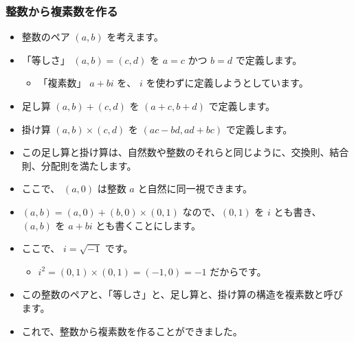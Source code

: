 \documentclass[dvipdfmx]{beamer}
\begin{document}
  \begin{frame}
    \frametitle{整数から複素数を作る}

    \begin{itemize}
      \item 整数のペア $(a,b)$ を考えます。
      \item 「等しさ」 $(a,b) = (c,d)$ を $a=c$ かつ $b=d$ で定義します。
      \begin{itemize}
        \item 「複素数」 $a + bi$ を、 $i$ を使わずに定義しようとしています。
      \end{itemize}

      \pause

      \item 足し算 $(a,b) + (c,d)$ を $(a+c, b+d)$ で定義します。

      \pause

      \item 掛け算 $(a,b) \times (c,d)$ を $(ac-bd, ad+bc)$ で定義します。

      \pause

      \item この足し算と掛け算は、自然数や整数のそれらと同じように、交換則、結合則、分配則を満たします。

      \pause

      \item ここで、 $(a,0)$ は整数 $a$ と自然に同一視できます。
      \item $(a,b) = (a,0) + (b,0) \times (0,1)$ なので、$(0,1)$ を $i$ とも書き、 $(a,b)$ を $a+bi$ とも書くことにします。

      \pause

      \item ここで、 $i = \sqrt{-1}$ です。
      \begin{itemize}
        \item $i^2 = (0,1) \times (0,1) = (-1,0) = -1$ だからです。
      \end{itemize}
      \item この整数のペアと、「等しさ」と、足し算と、掛け算の構造を複素数と呼びます。
      \item これで、整数から複素数を作ることができました。
    \end{itemize}

  \end{frame}
\end{document}
